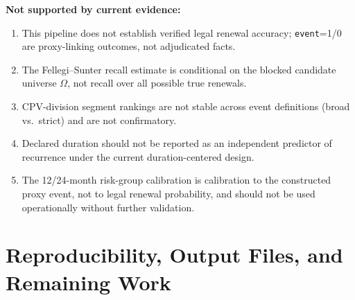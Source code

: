 \documentclass[11pt]{article}
\begin{document}
\textbf{Not supported by current evidence:}
\begin{enumerate}
  \item This pipeline does not establish verified legal renewal accuracy;
  \texttt{event}=1/0 are proxy-linking outcomes, not adjudicated facts.
  \item The Fellegi--Sunter recall estimate is conditional on the blocked
  candidate universe $\Omega$, not recall over all possible true renewals.
  \item CPV-division segment rankings are not stable across event
  definitions (broad vs.\ strict) and are not confirmatory.
  \item Declared duration should not be reported as an independent
  predictor of recurrence under the current duration-centered design.
  \item The 12/24-month risk-group calibration is calibration to the
  constructed proxy event, not to legal renewal probability, and should not
  be used operationally without further validation.
\end{enumerate}

\section{Reproducibility, Output Files, and Remaining Work}
\label{sec:repro}
\end{document}

